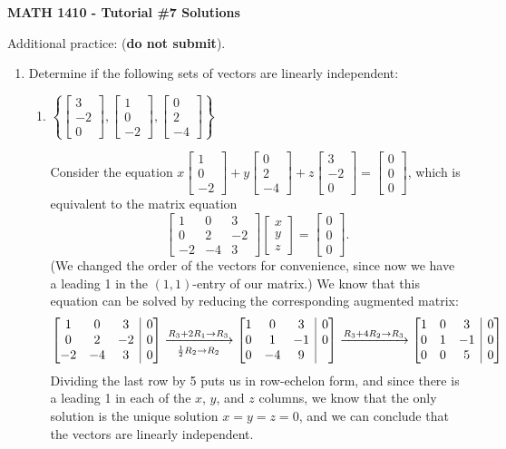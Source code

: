 \documentclass[12pt]{article}
\makeatletter
\newenvironment{amatrix}[1]{%
  \left[\begin{array}{@{}*{#1}{c}|c@{}}
}{%
  \end{array}\right]
}
\newcommand{\bbm}{\begin{bmatrix}}
\newcommand{\ebm}{\end{bmatrix}}
\newcommand{\bam}{\begin{amatrix}}
\newcommand{\eam}{\end{amatrix}}
\makeatother
\begin{document}
\author{Instructor: Sean Fitzpatrick}
\thispagestyle{empty}
\begin{center}
{\bf MATH 1410 - Tutorial \#7 Solutions}
\end{center}


Additional practice: (\textbf{do not submit}).
\begin{enumerate}
\item Determine if the following sets of vectors are linearly independent:
\begin{enumerate}
\item $\left\{\bbm 3\\-2\\0\ebm, \bbm 1\\0\\-2\ebm, \bbm 0\\2\\-4\ebm\right\}$

Consider the equation $x\bbm 1\\0\\-2\ebm+y \bbm 0\\2\\-4\ebm+z\bbm 3\\-2\\0\ebm=\bbm 0\\0\\0\ebm$, which is equivalent to the matrix equation
\[
\bbm 1&0&3\\0&2&-2\\-2&-4&3\ebm\bbm x\\y\\z\ebm = \bbm 0\\0\\0\ebm.
\]
(We changed the order of the vectors for convenience, since now we have a leading 1 in the $(1,1)$-entry of our matrix.) We know that this equation can be solved by reducing the corresponding augmented matrix:
\[
\bam{3} 1&0&3&0\\0&2&-2&0\\-2&-4&3&0\eam \xrightarrow[\frac12 R_2\to R_2]{R_3+2R_1\to R_3}\bam{3}1&0&3&0\\0&1&-1&0\\0&-4&9\eam\\
\xrightarrow{R_3+4R_2\to R_3}\bam{3}1&0&3&0\\0&1&-1&0\\0&0&5&0\eam
\]
Dividing the last row by 5 puts us in row-echelon form, and since there is a leading 1 in each of the $x$, $y$, and $z$ columns, we know that the only solution is the unique solution $x=y=z=0$, and we can conclude that the vectors are linearly independent.


\end{enumerate}
\end{enumerate}
\end{document}
